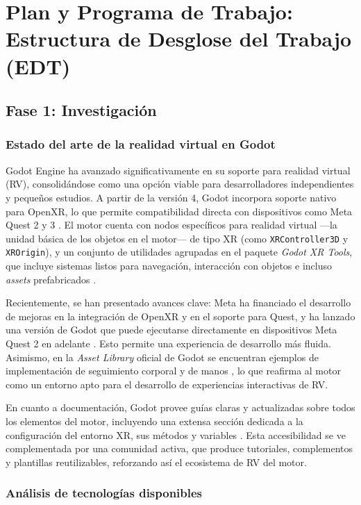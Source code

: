 \documentclass[journal,article,accept,pdftex,moreauthors]{Definitions/mdpi}
\begin{document}
\section{Plan y Programa de Trabajo: Estructura de Desglose del Trabajo (EDT)}

\subsection{Fase 1: Investigación}

\subsubsection{Estado del arte de la realidad virtual en Godot}
Godot Engine ha avanzado significativamente en su soporte para realidad virtual (RV), consolidándose como una opción viable para desarrolladores independientes y pequeños estudios. A partir de la versión 4, Godot incorpora soporte nativo para OpenXR, lo que permite compatibilidad directa con dispositivos como Meta Quest 2 y 3 \cite{godotDocs2024}. El motor cuenta con nodos específicos para realidad virtual —la unidad básica de los objetos en el motor— de tipo XR (como \texttt{XRController3D} y \texttt{XROrigin}), y un conjunto de utilidades agrupadas en el paquete \textit{Godot XR Tools}, que incluye sistemas listos para navegación, interacción con objetos e incluso \textit{assets} prefabricados \cite{godotXRTools2023}.

Recientemente, se han presentado avances clave: Meta ha financiado el desarrollo de mejoras en la integración de OpenXR y en el soporte para Quest, y ha lanzado una versión de Godot que puede ejecutarse directamente en dispositivos Meta Quest 2 en adelante \cite{godotMetaCollab2023}. Esto permite una experiencia de desarrollo más fluida. Asimismo, en la \textit{Asset Library} oficial de Godot se encuentran ejemplos de implementación de seguimiento corporal y de manos \cite{godotAssetLib2024}, lo que reafirma al motor como un entorno apto para el desarrollo de experiencias interactivas de RV.

En cuanto a documentación, Godot provee guías claras y actualizadas sobre todos los elementos del motor, incluyendo una extensa sección dedicada a la configuración del entorno XR, sus métodos y variables \cite{godotDocs2024}. Esta accesibilidad se ve complementada por una comunidad activa, que produce tutoriales, complementos y plantillas reutilizables, reforzando así el ecosistema de RV del motor.


\subsubsection{Análisis de tecnologías disponibles}
\end{document}
